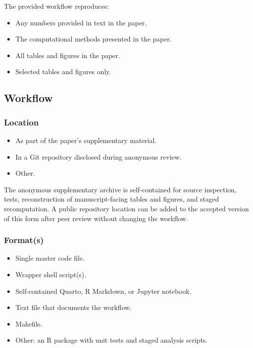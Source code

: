\documentclass[
  10pt,
]{article}
\providecommand{\tightlist}{%
  \setlength{\itemsep}{0pt}\setlength{\parskip}{0pt}}
\begin{document}
The provided workflow reproduces:

\begin{itemize}
\tightlist
\item[$\boxtimes$]
  Any numbers provided in text in the paper.
\item[$\boxtimes$]
  The computational methods presented in the paper.
\item[$\boxtimes$]
  All tables and figures in the paper.
\item[$\square$]
  Selected tables and figures only.
\end{itemize}

\subsection{Workflow}\label{workflow}

\subsubsection{Location}\label{location}

\begin{itemize}
\tightlist
\item[$\boxtimes$]
  As part of the paper's supplementary material.
\item[$\square$]
  In a Git repository disclosed during anonymous review.
\item[$\square$]
  Other.
\end{itemize}

The anonymous supplementary archive is self-contained for source
inspection, tests, reconstruction of manuscript-facing tables and
figures, and staged recomputation. A public repository location can be
added to the accepted version of this form after peer review without
changing the workflow.

\subsubsection{Format(s)}\label{formats}

\begin{itemize}
\tightlist
\item[$\boxtimes$]
  Single master code file.
\item[$\boxtimes$]
  Wrapper shell script(s).
\item[$\square$]
  Self-contained Quarto, R Markdown, or Jupyter notebook.
\item[$\boxtimes$]
  Text file that documents the workflow.
\item[$\boxtimes$]
  Makefile.
\item[$\boxtimes$]
  Other: an R package with unit tests and staged analysis scripts.
\end{itemize}
\end{document}
